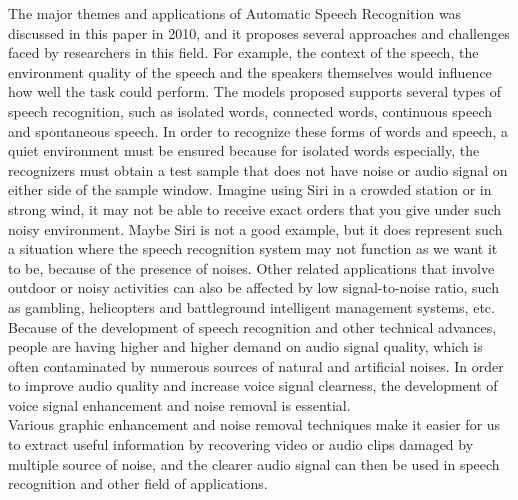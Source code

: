 \documentclass[runningheads,a4paper]{llncs}
\begin{document}
The major themes and applications of Automatic Speech Recognition was discussed in this paper \cite{1} in 2010, and it proposes several approaches and challenges faced by researchers in this field. For example, the context of the speech, the environment quality of the speech and the speakers themselves would influence how well the task could perform. The models proposed supports several types of speech recognition, such as isolated words, connected words, continuous speech and spontaneous speech. In order to recognize these forms of words and speech, a quiet environment must be ensured because for isolated words especially, the recognizers must obtain a test sample that does not have noise or audio signal on either side of the sample window. Imagine using Siri in a crowded station or in strong wind, it may not be able to receive exact orders that you give under such noisy environment. Maybe Siri is not a good example, but it does represent such a situation where the speech recognition system may not function as we want it to be, because of the presence of noises. Other related applications that involve outdoor or noisy activities can also be affected by low signal-to-noise ratio, such as gambling, helicopters and battleground intelligent management systems, etc.\\
 
Because of the development of speech recognition and other technical advances, people are having higher and higher demand on audio signal quality, which is often contaminated by numerous sources of natural and artificial noises. In order to improve audio quality and increase voice signal clearness, the development of voice signal enhancement and noise removal is essential.\\
 
Various graphic enhancement and noise removal techniques make it easier for us to extract useful information by recovering video or audio clips damaged by multiple source of noise, and the clearer audio signal can then be used in speech recognition and other field of applications.\\
\end{document}
